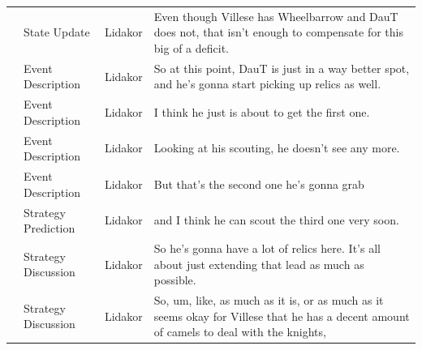 {\begin{longtable}{@{}>{\theAppRow}r|L{2.3cm}L{1.0cm}U{11.55cm}@{}}
    & State Update          & Lidakor & Even though Villese has Wheelbarrow and DauT does not, that isn't enough to compensate for this big of a deficit.                                                                                                                                                                               \\
    & Event Description     & Lidakor & So at this point, DauT is just in a way better spot, and he's gonna start picking up relics as well.                                                                                                                                                                                            \\
    & Event Description     & Lidakor & I think he just is about to get the first one.                                                                                                                                                                                                                                                  \\
    & Event Description     & Lidakor & Looking at his scouting, he doesn't see any more.                                                                                                                                                                                                                                               \\
    & Event Description     & Lidakor & But that's the second one he's gonna grab                                                                                                                                                                                                                                                       \\
    & Strategy Prediction   & Lidakor & and I think he can scout the third one very soon.                                                                                                                                                                                                                                               \\
    & Strategy Discussion   & Lidakor & So he's gonna have a lot of relics here. It's all about just extending that lead as much as possible.                                                                                                                                                                                           \\
    & Strategy Discussion   & Lidakor & So, um, like, as much as it is, or as much as it seems okay for Villese that he has a decent amount of camels to deal with the knights,                                                                                                                                                         \\

\end{longtable}}
